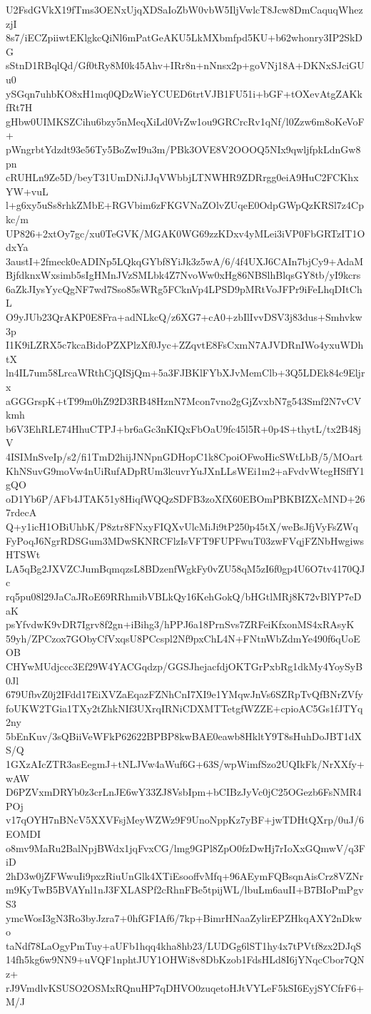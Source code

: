 U2FsdGVkX19fTms3OENxUjqXDSaIoZbW0vbW5IljVwlcT8Jcw8DmCaquqWhezzjI
8s7/iECZpiiwtEKlgkcQiNl6mPatGeAKU5LkMXbmfpd5KU+b62whonry3IP2SkDG
sStnD1RBqlQd/Gf0tRy8M0k45Ahv+IRr8n+nNnsx2p+goVNj18A+DKNxSJciGUu0
ySGqn7uhbKO8xH1mq0QDzWieYCUED6trtVJB1FU51i+bGF+tOXevAtgZAKkfRt7H
gHbw0UIMKSZCihu6bzy5nMeqXiLd0VrZw1ou9GRCrcRv1qNf/l0Zzw6m8oKeVoF+
pWngrbtYdzdt93e56Ty5BoZwI9u3m/PBk3OVE8V2OOOQ5NIx9qwljfpkLdnGw8pn
cRUHLn9Ze5D/beyT31UmDNiJJqVWbbjLTNWHR9ZDRrgg0eiA9HuC2FCKhxYW+vuL
l+g6xy5uSs8rhkZMbE+RGVbim6zFKGVNaZOlvZUqeE0OdpGWpQzKRSl7z4Cpkc/m
UP826+2xtOy7gc/xu0TeGVK/MGAK0WG69zzKDxv4yMLei3iVP0FbGRTzIT1OdxYa
3austI+2fmeck0eADINp5LQkqGYbf8YiJk3z5wA/6/4f4UXJ6CAIn7bjCy9+AdaM
BjfdknxWxsimb5sIgHMnJVzSMLbk4Z7NvoWw0xHg86NBSlhBlqsGY8tb/yI9kcrs
6aZkJIysYycQgNF7wd7Sso85sWRg5FCknVp4LPSD9pMRtVoJFPr9iFeLhqDItChL
O9yJUb23QrAKP0E8Fra+adNLkcQ/z6XG7+cA0+zbIlIvvDSV3j83dus+Smhvkw3p
I1K9iLZRX5c7kcaBidoPZXPlzXf0Jyc+ZZqvtE8FsCxmN7AJVDRnIWo4yxuWDhtX
ln4IL7um58LrcaWRthCjQISjQm+5a3FJBKlFYbXJvMemClb+3Q5LDEk84c9Eljrx
aGGGrspK+tT99m0hZ92D3RB48HznN7Mcon7vno2gGjZvxbN7g543Smf2N7vCVkmh
b6V3EhRLE74HhuCTPJ+br6aGc3nKIQxFbOaU9fc45l5R+0p4S+thytL/tx2B48jV
4ISIMnSveIp/s2/fi1TmD2hijJNNpnGDHopC1k8CpoiOFwoHicSWtLbB/5/MOart
KhNSuvG9moVw4nUiRufADpRUm3lcuvrYuJXnLLsWEi1m2+aFvdvWtegHSffY1gQO
oD1Yb6P/AFb4JTAK51y8HiqfWQQzSDFB3zoXfX60EBOmPBKBIZXcMND+267rdecA
Q+y1icH1OBiUhbK/P8ztr8FNxyFIQXvUlcMiJi9tP250p45tX/weBsJfjVyFsZWq
FyPoqJ6NgrRDSGum3MDwSKNRCFlzIsVFT9FUPFwuT03zwFVqjFZNbHwgiwsHTSWt
LA5qBg2JXVZCJumBqmqzsL8BDzenfWgkFy0vZU58qM5zI6f0gp4U6O7tv4170QJc
rq5pu08l29JaCaJRoE69RRhmibVBLkQy16KehGokQ/bHGtlMRj8K72vBlYP7eDaK
psYfvdwK9vDR7Igrv8f2gn+iBihg3/hPPJ6a18PrnSvs7ZRFeiKfxonMS4xRAsyK
59yh/ZPCzox7GObyCfVxqsU8PCcspl2Nf9pxChL4N+FNtnWbZdmYe490f6qUoEOB
CHYwMUdjccc3Ef29W4YACGqdzp/GGSJhejacfdjOKTGrPxbRg1dkMy4YoySyB0Jl
679UfbvZ0j2IFdd17EiXVZaEqazFZNhCnI7XI9e1YMqwJnVs6SZRpTvQfBNrZVfy
foUKW2TGia1TXy2tZhkNIf3UXrqIRNiCDXMTTetgfWZZE+cpioAC5Gs1fJTYq2ny
5bEnKuv/3sQBiiVeWFkP62622BPBP8kwBAE0eawb8HkltY9T8sHuhDoJBT1dXS/Q
1GXzAIcZTR3asEegmJ+tNLJVw4aWuf6G+63S/wpWimfSzo2UQIkFk/NrXXfy+wAW
D6PZVxmDRYb0z3crLnJE6wY33ZJ8VsbIpm+bCIBzJyVc0jC25OGezb6FsNMR4POj
v17qOYH7nBNcV5XXVFsjMeyWZWz9F9UnoNppKz7yBF+jwTDHtQXrp/0uJ/6EOMDI
o8mv9MaRu2BalNpjBWdx1jqFvxCG/lmg9GPl8ZpO0fzDwHj7rIoXxGQmwV/q3FiD
2hD3w0jZFWwuIi9pxzRiuUnGlk4XTiEsooffvMfq+96AEymFQBsqnAisCrz8VZNr
m9KyTwB5BVAYnl1nJ3FXLASPf2cRhnFBe5tpijWL/lbuLm6auII+B7BIoPmPgvS3
ymcWosI3gN3Ro3byJzra7+0hfGFIAf6/7kp+BimrHNaaZylirEPZHkqAXY2nDkwo
taNdf78LaOgyPmTuy+aUFb1hqq4kha8hb23/LUDGg6lST1hy4x7tPVtf8zx2DJqS
14fh5kg6w9NN9+uVQF1nphtJUY1OHWi8v8DbKzob1FdsHLd8I6jYNqcCbor7QNz+
rJ9VmdlvKSUSO2OSMxRQnuHP7qDHVO0zuqetoHJtVYLeF5kSI6EyjSYCfrF6+M/J
